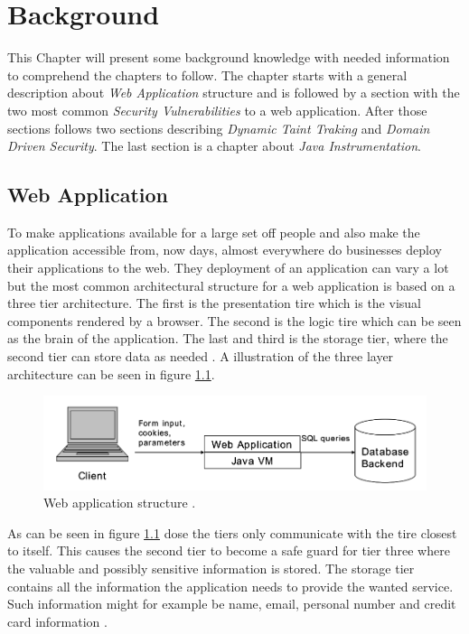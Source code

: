 \chapter{Background}
This Chapter will present some background knowledge with needed information to comprehend the chapters to follow. The chapter starts with a general description about \textit{Web Application} structure and is followed by a section with the two most common \textit{Security Vulnerabilities} to a web application. After those sections follows two sections describing \textit{Dynamic Taint Traking} and \textit{Domain Driven Security}. The last section is a chapter about \textit{Java Instrumentation}.


\section{Web Application}
To make applications available for a large set off people and also make the application accessible from, now days, almost everywhere do businesses deploy their applications to the web. They deployment of an application can vary a lot but the most common architectural structure for a web application is based on a three tier architecture. The first is the presentation tire which is the visual components rendered by a browser. The second is the logic tire which can be seen as the brain of the application. The last and third is the storage tier, where the second tier can store data as needed \parencite{JustinClarke-Salt2009SIAa}. A illustration of the three layer architecture can be seen in figure \ref{fig:webApplication-Haldar}.

\begin{figure}
  \centering
  \includegraphics[width=\textwidth]{images/webApplication-Haldar.png}
  \caption{Web application structure \cite{Haldar}.}
  \label{fig:webApplication-Haldar}
\end{figure}

As can be seen in figure \ref{fig:webApplication-Haldar} dose the tiers only communicate with the tire closest to itself. This causes the second tier to become a safe guard for tier three where the valuable and possibly sensitive information is stored. The storage tier contains all the information the application needs to provide the wanted service. Such information might for example be name, email, personal number and credit card information \parencite{JustinClarke-Salt2009SIAa}.


